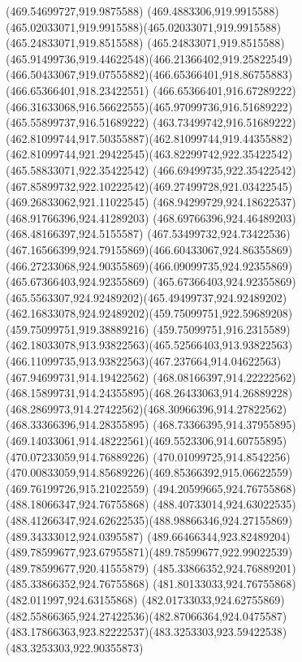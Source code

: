 {{{{				\lineto(469.54699727,919.9875588)
				\curveto(469.4883306,919.9915588)(465.02033071,919.9915588)(465.02033071,919.9915588)
				\lineto(465.24833071,919.8515588)
				\curveto(465.24833071,919.8515588)(465.91499736,919.44622548)(466.21366402,919.25822549)
				\curveto(466.50433067,919.07555882)(466.65366401,918.86755883)(466.65366401,918.23422551)
				\lineto(466.65366401,916.67289222)
				\curveto(466.31633068,916.56622555)(465.97099736,916.51689222)(465.55899737,916.51689222)
				\curveto(463.73499742,916.51689222)(462.81099744,917.50355887)(462.81099744,919.44355882)
				\curveto(462.81099744,921.29422545)(463.82299742,922.35422542)(465.58833071,922.35422542)
				\curveto(466.69499735,922.35422542)(467.85899732,922.10222542)(469.27499728,921.03422545)
				\lineto(469.26833062,921.11022545)
				\lineto(468.94299729,924.18622537)
				\lineto(468.91766396,924.41289203)
				\lineto(468.69766396,924.46489203)
				\lineto(468.48166397,924.5155587)
				\curveto(467.53499732,924.73422536)(467.16566399,924.79155869)(466.60433067,924.86355869)
				\curveto(466.27233068,924.90355869)(466.09099735,924.92355869)(465.67366403,924.92355869)
				\curveto(465.67366403,924.92355869)(465.5563307,924.92489202)(465.49499737,924.92489202)
				\curveto(462.16833078,924.92489202)(459.75099751,922.59689208)(459.75099751,919.38889216)
				\curveto(459.75099751,916.2315589)(462.18033078,913.93822563)(465.52566403,913.93822563)
				\curveto(466.11099735,913.93822563)(467.237664,914.04622563)(467.94699731,914.19422562)
				\curveto(468.08166397,914.22222562)(468.15899731,914.24355895)(468.26433063,914.26889228)
				\curveto(468.2869973,914.27422562)(468.30966396,914.27822562)(468.33366396,914.28355895)
				\curveto(468.73366395,914.37955895)(469.14033061,914.48222561)(469.5523306,914.60755895)
				\lineto(470.07233059,914.76889226)
				\lineto(470.01099725,914.8542256)
				\curveto(470.00833059,914.85689226)(469.85366392,915.06622559)(469.76199726,915.21022559)
				\moveto(494.20599665,924.76755868)
				\lineto(488.18066347,924.76755868)
				\lineto(488.40733014,924.63022535)
				\curveto(488.41266347,924.62622535)(488.98866346,924.27155869)(489.34333012,924.0395587)
				\curveto(489.66466344,923.82489204)(489.78599677,923.67955871)(489.78599677,922.99022539)
				\lineto(489.78599677,920.41555879)
				\lineto(485.33866352,924.76889201)
				\lineto(485.33866352,924.76755868)
				\lineto(481.80133033,924.76755868)
				\lineto(482.011997,924.63155868)
				\curveto(482.01733033,924.62755869)(482.55866365,924.27422536)(482.87066364,924.0475587)
				\curveto(483.17866363,923.82222537)(483.3253303,923.59422538)(483.3253303,922.90355873)
}}}}
